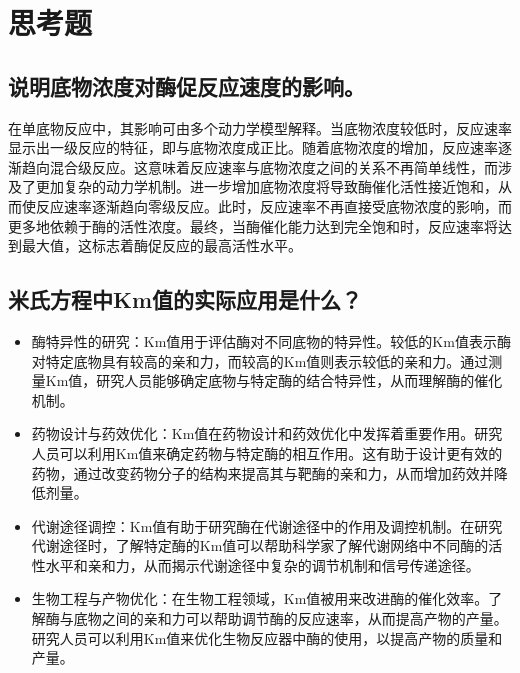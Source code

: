 \documentclass[UTF8]{ctexart}
\begin{document}
	\section{思考题}
	\subsection{说明底物浓度对酶促反应速度的影响。}
        在单底物反应中，其影响可由多个动力学模型解释。当底物浓度较低时，反应速率显示出一级反应的特征，即与底物浓度成正比。随着底物浓度的增加，反应速率逐渐趋向混合级反应。这意味着反应速率与底物浓度之间的关系不再简单线性，而涉及了更加复杂的动力学机制。进一步增加底物浓度将导致酶催化活性接近饱和，从而使反应速率逐渐趋向零级反应。此时，反应速率不再直接受底物浓度的影响，而更多地依赖于酶的活性浓度。最终，当酶催化能力达到完全饱和时，反应速率将达到最大值，这标志着酶促反应的最高活性水平。
        \subsection{米氏方程中Km值的实际应用是什么？}
        \begin{itemize}
            \item 酶特异性的研究：Km值用于评估酶对不同底物的特异性。较低的Km值表示酶对特定底物具有较高的亲和力，而较高的Km值则表示较低的亲和力。通过测量Km值，研究人员能够确定底物与特定酶的结合特异性，从而理解酶的催化机制。
            \item 药物设计与药效优化：Km值在药物设计和药效优化中发挥着重要作用。研究人员可以利用Km值来确定药物与特定酶的相互作用。这有助于设计更有效的药物，通过改变药物分子的结构来提高其与靶酶的亲和力，从而增加药效并降低剂量。
            \item 代谢途径调控：Km值有助于研究酶在代谢途径中的作用及调控机制。在研究代谢途径时，了解特定酶的Km值可以帮助科学家了解代谢网络中不同酶的活性水平和亲和力，从而揭示代谢途径中复杂的调节机制和信号传递途径。
            \item 生物工程与产物优化：在生物工程领域，Km值被用来改进酶的催化效率。了解酶与底物之间的亲和力可以帮助调节酶的反应速率，从而提高产物的产量。研究人员可以利用Km值来优化生物反应器中酶的使用，以提高产物的质量和产量。
        \end{itemize}
\end{document}
